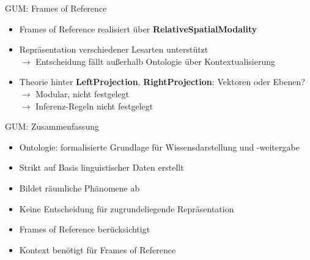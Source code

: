 \documentclass[12pt,a4paper]{beamer}
\begin{document}
\begin{frame}{GUM: Frames of Reference}
\begin{itemize}
\item Frames of Reference realisiert über \textbf{RelativeSpatialModality}
\item Repräsentation verschiedener Lesarten unterstützt \\
$\to$ Entscheidung fällt außerhalb Ontologie über Kontextualisierung
\item Theorie hinter \textbf{LeftProjection}, \textbf{RightProjection}: Vektoren oder Ebenen? \\
$\to$ Modular, nicht festgelegt \\
$\to$ Inferenz-Regeln nicht festgelegt
\end{itemize}
\end{frame}

\begin{frame}{GUM: Zusammenfassung}
\begin{itemize}
\item Ontologie: formalisierte Grundlage für Wissensdarstellung und -weitergabe
\item Strikt auf Basis linguistischer Daten erstellt
\item Bildet räumliche Phänomene ab
\item Keine Entscheidung für zugrundeliegende Repräsentation
\item Frames of Reference berücksichtigt
\item Kontext benötigt für Frames of Reference
\end{itemize}
\end{frame}







\end{document}
